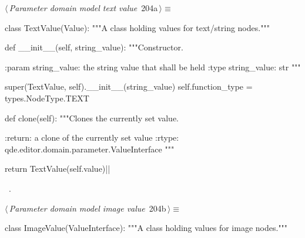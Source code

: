 \documentclass[%
    a4paper,    %
    justified,  %
    nobib,      %
    openany     %
]{tufte-book}
\makeatletter
\renewcommand{\label}[1]{\@tufte@label{##1}}%
\makeatother
\begin{document}
\begin{fullwidth}
\begin{flushleft}
\begin{minipage}{\linewidth}
\begin{list}{}{\setlength{\itemsep}{-\parsep}\setlength{\itemindent}{-\leftmargin}}
\item{}
\end{list}
\end{minipage}\vspace{4ex}
\end{flushleft}
\begin{flushleft} \small
\begin{minipage}{\linewidth}\label{scrap197}\raggedright\small
{} $\langle\,${\itshape Parameter domain model text value}\nobreak\ {\footnotesize {204a}}$\,\rangle\equiv$
\vspace{-1ex}
\begin{pythoncode}
class TextValue(Value):
    """A class holding values for text/string nodes."""

    def __init__(self, string_value):
        """Constructor.

        :param string_value: the string value that shall be held
        :type  string_value: str
        """

        super(TextValue, self).__init__(string_value)
        self.function_type = types.NodeType.TEXT

    def clone(self):
        """Clones the currently set value.

        :return: a clone of the currently set value
        :rtype:  qde.editor.domain.parameter.ValueInterface
        """

        return TextValue(self.value)|\NWsep|
\end{pythoncode}
\vspace{1.5ex}
\footnotesize
\begin{list}{}{\setlength{\itemsep}{-\parsep}\setlength{\itemindent}{-\leftmargin}}
\item \NWtxtMacroRefIn\ .

\item{}
\end{list}
\end{minipage}\vspace{4ex}
\end{flushleft}
\begin{flushleft} \small
\begin{minipage}{\linewidth}\label{scrap198}\raggedright\small
{} $\langle\,${\itshape Parameter domain model image value}\nobreak\ {\footnotesize {204b}}$\,\rangle\equiv$
\vspace{-1ex}
\begin{pythoncode}
class ImageValue(ValueInterface):
    """A class holding values for image nodes."""


\end{pythoncode}
\end{minipage}
\end{flushleft}
\end{fullwidth}
\end{document}
